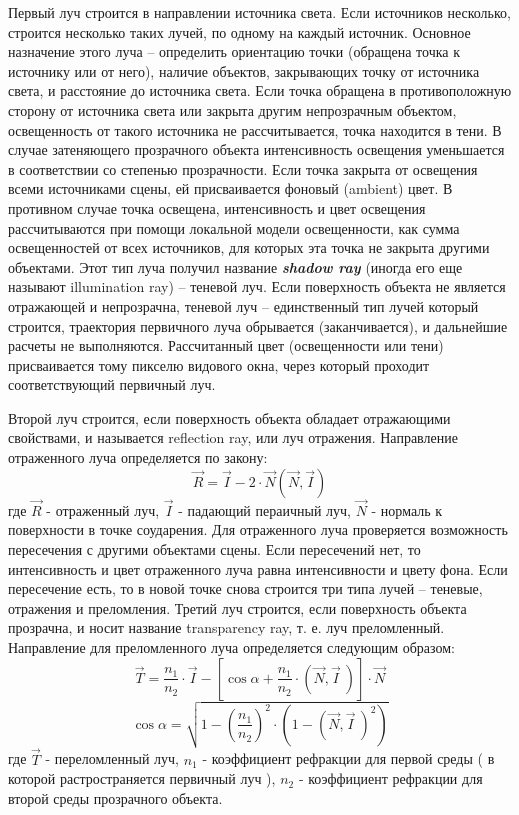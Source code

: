 Первый луч строится в направлении источника света. Если источников несколько, строится несколько таких лучей, по одному на каждый источник. Основное назначение этого луча – определить ориентацию точки (обращена точка к источнику или от него), наличие объектов, закрывающих точку от источника света, и расстояние до источника света. Если точка обращена в противоположную сторону от источника света или закрыта другим непрозрачным объектом, освещенность от такого источника не рассчитывается, точка находится в тени. В случае затеняющего прозрачного объекта интенсивность освещения уменьшается в соответствии со степенью прозрачности. Если точка закрыта от освещения всеми источниками сцены, ей присваивается фоновый (ambient) цвет. В противном случае точка освещена, интенсивность и цвет освещения рассчитываются при помощи локальной модели освещенности, как сумма освещенностей от всех источников, для которых эта точка не закрыта другими объектами. Этот тип луча получил название  \textit{\textbf{shadow ray}} (иногда его еще называют illumination ray) – теневой луч. Если поверхность объекта не является отражающей и непрозрачна, теневой луч – единственный тип лучей который строится, траектория первичного луча обрывается (заканчивается), и дальнейшие расчеты не выполняются. Рассчитанный цвет (освещенности или тени) присваивается тому пикселю видового окна, через который проходит соответствующий первичный луч.
   \par
   Второй луч строится, если поверхность объекта обладает отражающими свойствами, и называется  reflection ray, или луч отражения. Направление отраженного луча определяется по закону:
$$
	\vec{R} = \vec{I} - 2 \cdot \vec{N} (\vec{N} , \vec{I})
$$
где $\vec{R}$ - отраженный луч, $\vec{I}$ - падающий пераичный луч, $\vec{N}$ - нормаль к поверхности в точке соударения.
Для отраженного луча проверяется возможность пересечения с другими объектами сцены. Если пересечений нет, то интенсивность и цвет отраженного луча равна интенсивности и цвету фона. Если пересечение есть, то в новой точке снова строится три типа лучей – теневые, отражения и преломления.
Третий луч строится, если поверхность объекта прозрачна, и носит название transparency ray, т. е. луч преломленный. Направление для преломленного луча определяется следующим образом:
$$
 \vec{T} = \frac{n_1}{n_2} \cdot \vec{I} - \left[ \cos \alpha + \frac{n_1}{n_2} \cdot \left(\vec{N},\vec{I} \ \right) \right] \cdot \vec{N}
$$
$$
\cos \alpha = \sqrt{1 - \left( \frac{n_1}{n_2} \right) ^2 \cdot \left(1-\left(\vec{N},\vec{I}\ \right)^2\right)}
$$
где $\vec{T}$ - переломленный луч, $n_1$ - коэффициент рефракции для первой среды ( в которой растространяется первичный луч ), $n_2$ - коэффициент рефракции для второй среды прозрачного объекта.

